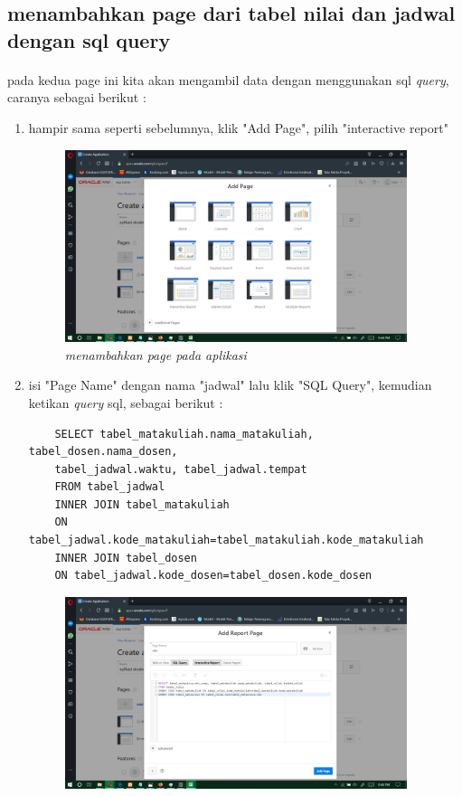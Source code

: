 \documentclass[12pt]{ociamthesis}  %
\begin{document}
\subsection{menambahkan page dari tabel nilai dan jadwal dengan sql query}
\paragraph{}
pada kedua page ini kita akan mengambil data dengan menggunakan sql \textit{query}, caranya sebagai berikut :
\begin{enumerate}
	\item hampir sama seperti sebelumnya, klik "Add Page", pilih "interactive report"
	\begin{figure}[H]
    \centering
	\includegraphics[width=10cm]{figures/add page/Screenshot (241).png} 
    \caption{\textit{menambahkan page pada aplikasi}}
    \label{foto21}
 	\end{figure}
	\item isi "Page Name" dengan nama "jadwal" lalu klik "SQL Query", kemudian ketikan \textit{query} sql, sebagai berikut :
	\begin{verbatim}
	SELECT tabel_matakuliah.nama_matakuliah, tabel_dosen.nama_dosen, 
	tabel_jadwal.waktu, tabel_jadwal.tempat
	FROM tabel_jadwal
	INNER JOIN tabel_matakuliah 
	ON tabel_jadwal.kode_matakuliah=tabel_matakuliah.kode_matakuliah
	INNER JOIN tabel_dosen 
	ON tabel_jadwal.kode_dosen=tabel_dosen.kode_dosen
	\end{verbatim}
	\begin{figure}[H]
    \centering
	\includegraphics[width=10cm]{figures/add page/Screenshot (243).png} 

\end{figure}
\end{enumerate}
\end{document}

